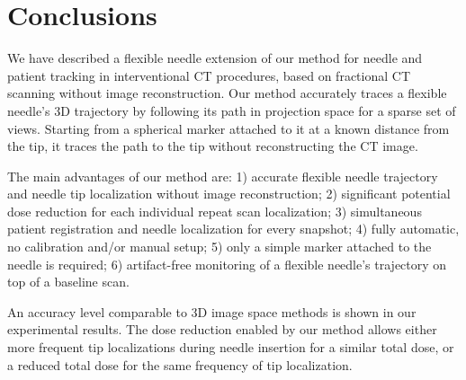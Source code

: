 \documentclass[letterpaper, 11 pt, conference]{ieeeconf} %
\begin{document}
\section{Conclusions}
We have described a flexible needle extension of our method for needle and patient tracking in interventional CT procedures, based on fractional CT scanning without image reconstruction.
Our method accurately traces a flexible needle's 3D trajectory by following its path in projection space for a sparse set of views. Starting from a spherical marker attached to it at a known distance from the tip, it traces the path to the tip without reconstructing the CT image.

The main advantages of our method are:
1) accurate flexible needle trajectory and needle tip localization without image reconstruction;
2) significant potential dose reduction for each individual repeat scan localization;
3) simultaneous patient registration and needle localization for every snapshot; 
4) fully automatic, no calibration and/or manual setup;
5) only a simple marker attached to the needle is required; 
6) artifact-free monitoring of a flexible needle's trajectory on top of a baseline scan.

An accuracy level comparable to 3D image space methods is shown in our experimental results.
The dose reduction enabled by our method allows either more frequent tip localizations during needle insertion for a similar total dose, or a reduced total dose for the same frequency of tip localization.





\end{document}
